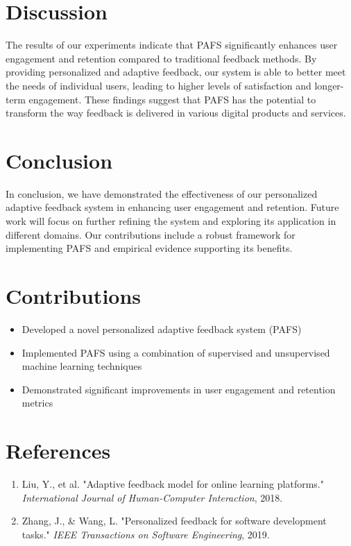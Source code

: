 \documentclass{article}
\begin{document}
\section{Discussion}
The results of our experiments indicate that PAFS significantly enhances user engagement and retention compared to traditional feedback methods. By providing personalized and adaptive feedback, our system is able to better meet the needs of individual users, leading to higher levels of satisfaction and longer-term engagement. These findings suggest that PAFS has the potential to transform the way feedback is delivered in various digital products and services.

\section{Conclusion}
In conclusion, we have demonstrated the effectiveness of our personalized adaptive feedback system in enhancing user engagement and retention. Future work will focus on further refining the system and exploring its application in different domains. Our contributions include a robust framework for implementing PAFS and empirical evidence supporting its benefits.

\section{Contributions}
\begin{itemize}
\item Developed a novel personalized adaptive feedback system (PAFS)
\item Implemented PAFS using a combination of supervised and unsupervised machine learning techniques
\item Demonstrated significant improvements in user engagement and retention metrics
\end{itemize}

\section*{References}
\begin{enumerate}
\item Liu, Y., et al. "Adaptive feedback model for online learning platforms." \textit{International Journal of Human-Computer Interaction}, 2018.
\item Zhang, J., & Wang, L. "Personalized feedback for software development tasks." \textit{IEEE Transactions on Software Engineering}, 2019.
\end{enumerate}
\end{document}
